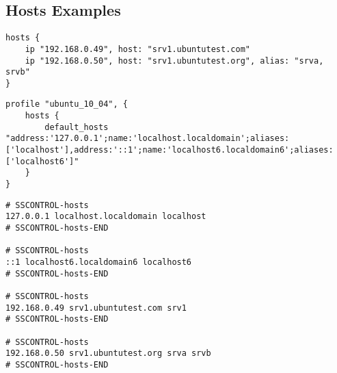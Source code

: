 \subsection{Hosts Examples}

\begin{lstlisting}[style=Sscontrol,
label={lst:hosts_example_script},
title={Adds IP addresses and the host name.}]
hosts {
    ip "192.168.0.49", host: "srv1.ubuntutest.com"
    ip "192.168.0.50", host: "srv1.ubuntutest.org", alias: "srva, srvb"
}
\end{lstlisting}

\begin{lstlisting}[style=Sscontrol,
label={lst:hosts_ubuntu_profile},
title={Sets default list of hosts.}]
profile "ubuntu_10_04", {
    hosts {
        default_hosts "address:'127.0.0.1';name:'localhost.localdomain';aliases:['localhost'],address:'::1';name:'localhost6.localdomain6';aliases:['localhost6']"
    }
}
\end{lstlisting}

\begin{lstlisting}[style=rcfile_nonumbers,
label={lst:hosts_example},
title={Example hosts configuration file.}]
# SSCONTROL-hosts
127.0.0.1 localhost.localdomain localhost
# SSCONTROL-hosts-END

# SSCONTROL-hosts
::1 localhost6.localdomain6 localhost6
# SSCONTROL-hosts-END

# SSCONTROL-hosts
192.168.0.49 srv1.ubuntutest.com srv1
# SSCONTROL-hosts-END

# SSCONTROL-hosts
192.168.0.50 srv1.ubuntutest.org srva srvb
# SSCONTROL-hosts-END
\end{lstlisting}

